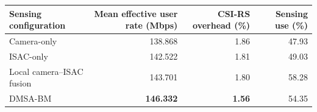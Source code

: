 \begin{tabular}{lrrr}
\toprule
Sensing configuration & Mean effective user rate (Mbps) & CSI-RS overhead (\%) & Sensing use (\%) \\
\midrule
Camera-only & 138.868 & 1.86 & 47.93 \\
ISAC-only & 142.522 & 1.81 & 49.03 \\
Local camera--ISAC fusion & 143.701 & 1.80 & 58.28 \\
DMSA-BM & \textbf{146.332} & \textbf{1.56} & 54.35 \\
\bottomrule
\end{tabular}
